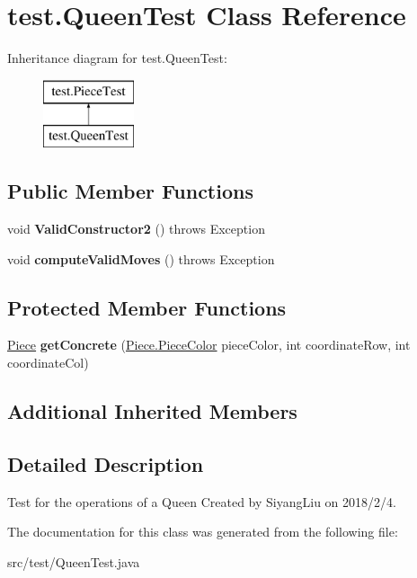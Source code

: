 \hypertarget{classtest_1_1_queen_test}{}\section{test.\+Queen\+Test Class Reference}
\label{classtest_1_1_queen_test}
Inheritance diagram for test.\+Queen\+Test\+:\begin{figure}[H]
\begin{center}
\leavevmode
\includegraphics[height=2.000000cm]{classtest_1_1_queen_test}
\end{center}
\end{figure}
\subsection*{Public Member Functions}
\begin{DoxyCompactItemize}
\item 
\mbox{\label{classtest_1_1_queen_test_ae382115ee724469b7c5f4200c534ef19}} 
void {\bfseries Valid\+Constructor2} ()  throws Exception 
\item 
\mbox{\label{classtest_1_1_queen_test_a6ec00eab5072d465ffd954787d6e8dd3}} 
void {\bfseries compute\+Valid\+Moves} ()  throws Exception 
\end{DoxyCompactItemize}
\subsection*{Protected Member Functions}
\begin{DoxyCompactItemize}
\item 
\mbox{\label{classtest_1_1_queen_test_acb7901fbd2a81c67c739f72bbfe98f6d}} 
\mbox{\hyperlink{classpieces_1_1_piece}{Piece}} {\bfseries get\+Concrete} (\mbox{\hyperlink{enumpieces_1_1_piece_1_1_piece_color}{Piece.\+Piece\+Color}} piece\+Color, int coordinate\+Row, int coordinate\+Col)
\end{DoxyCompactItemize}
\subsection*{Additional Inherited Members}


\subsection{Detailed Description}
Test for the operations of a Queen Created by Siyang\+Liu on 2018/2/4. 

The documentation for this class was generated from the following file\+:\begin{DoxyCompactItemize}
\item 
src/test/Queen\+Test.\+java\end{DoxyCompactItemize}
